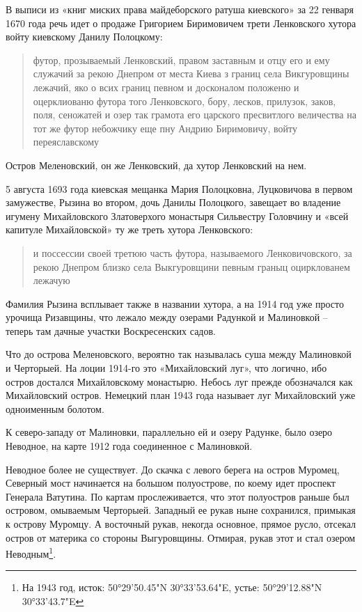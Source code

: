 В выписи из «книг миских права майдеборского ратуша киевского» за 22 генваря 1670 года речь идет о продаже Григорием Биримовичем трети Ленковского хутора войту киевскому Данилу Полоцкому\cite{mihdocs}:

\begin{quotation}
футор, прозываемый Ленковский, правом заставным и отцу его и ему служачий за рекою Днепром от места Киева з границ села Викгуровщины лежачий, яко о всих границ певном и досконалом положеню и оцерклиованю футора того Ленковского, бору, лесков, прилузок, заков, поля, сеножатей и озер так грамота его царского пресвитлого величества на тот же футор небожчику еще пну Андрию Биримовичу, войту переяславскому
\end{quotation}

Остров Меленовский, он же Ленковский, да хутор Ленковский на нем.

5 августа 1693 года киевская мещанка Мария Полоцковна, Луцковичова в первом замужестве, Рызина во втором, дочь Данилы Полоцкого, завещает во владение игумену Михайловского Златоверхого монастыря Сильвестру Головчину и «всей капитуле Михайловской» ту же треть хутора Ленковского\cite{mihdocs}: 

\begin{quotation}
и поссессии своей третюю часть футора, называемого Ленковичовского, за рекою Днепром близко села Выкгуровщини певным граныц оцирклованем лежачую
\end{quotation}

Фамилия Рызина всплывает также в названии хутора, а на 1914 год уже просто урочища Ризавщины, что лежало между озерами Радункой и Малиновкой – теперь там дачные участки Воскресенских садов.

Что до острова Меленовского, вероятно так называлась суша между Малиновкой и Черторыей. На лоции 1914-го это «Михайловский луг», что логично, ибо остров достался Михайловскому монастырю. Небось луг прежде обозначался как Михайловский остров. Немецкий план 1943 года называет луг Михайловский уже одноименным болотом.

К северо-западу от Малиновки, параллельно ей и озеру Радунке, было озеро Неводное, на карте 1912 года соединенное с Малиновкой.%

Неводное более не существует. До скачка с левого берега на остров Муромец, Северный мост начинается на большом полуострове, по коему идет проспект Генерала Ватутина. По картам прослеживается, что этот полуостров раньше был островом, омываемым Черторыей. Западный ее рукав ныне сохранился, примыкая к острову Муромцу. А восточный рукав, некогда основное, прямое русло, отсекал остров от материка со стороны Выгуровщины. Отмирая, рукав этот и стал озером Неводным\footnote{На 1943 год, исток: 50°29'50.45"N 30°33'53.64"E, устье: 50°29'12.88"N  30°33'43.7"E}. 


